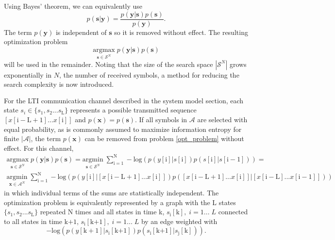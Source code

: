 \documentclass[12pt,a4paper]{report}
\begin{document}
Using Bayes' theorem, we can equivalently use 
\begin{equation*}
p(\mathbf{s}|\mathbf{y}) = 
\frac
{p(\mathbf{y}|\mathbf{s})p(\mathbf{s})}
{p(\mathbf{y})}.
\end{equation*}
The term $p(\mathbf{y})$ is independent of $\mathbf{s}$ so it is removed without effect. The resulting optimization problem
\begin{equation}\label{opt_problem}
\underset{\mathbf{s}\in\mathcal{S}^N}{\text{argmax}}\; p(\mathbf{y}|\mathbf{s})p(\mathbf{s})
\end{equation}
will be used in the remainder.
Noting that the size of the search space $|\mathcal{S}^N|$ grows exponentially in $N$, the number of received symbols, a method for reducing the search complexity is now introduced. 
\par
For the LTI communication channel described in the system model section, each state $s_i \in \{s_1, s_2... s_{\text{L}}\}$ represents a possible transmitted sequence $[x[\mathrm{i-L+1}]...x[\mathrm{i}]]$  and $p(\mathbf{x})=p(\mathbf{s})$. If all symbols in $\mathcal{A}$ are selected with equal probability, as is commonly assumed to maximize information entropy for finite $|\mathcal{A}|$, the term $p(\mathbf{x})$ can be removed from problem \ref{opt_problem} without effect. 
For this channel,
\begin{gather*}
\underset{\mathbf{s}\in\mathcal{S}^N}{\text{argmax}} \; p(\mathbf{y}|\mathbf{s})p(\mathbf{s})=
\underset{\mathbf{s}\in\mathcal{S}^N}{\text{argmin}} \; \sum_{\mathrm{i=1}}^{\mathrm{N}} -\text{log}(p(y[\mathrm{i}]|s[\mathrm{i}]) p(s[\mathrm{i}]|s[\mathrm{i-1}]))=\\
\underset{\mathbf{x}\in\mathcal{A}^N}{\text{argmin}} \; \sum_{\mathrm{i=1}}^{\mathrm{N}} -\text{log}(p(y[\mathrm{i}]|\left[x[\mathrm{i-L+1}]...x[\mathrm{i}]\right]) p(\left[x[\mathrm{i-L+1}]...x[\mathrm{i}]\right]|\left[x[\mathrm{i-L}]...x[\mathrm{i-1}]\right]))
\end{gather*}
in which individual terms of the sums are statistically independent. The optimization problem is equivalently
  represented by a graph with the L states $\{s_1, s_2... s_{\text{L}}\}$ repeated N times and all states in time k, $s_{\text{i}}[\text{k}], \; i = 1... \;L$ connected to all states in time k$+1$, $s_{\text{i}}[\text{k+1}], \; i = 1... \;L$ 
   by an edge weighted with
\begin{equation*}
-\text{log}(p(y[\text{k}+1]|s_{\text{i}}[\text{k+1}])p(s_{\text{i}}[\text{k+1}]|s_{\text{j}}[\text{k}])).
\end{equation*}   
\end{document}
